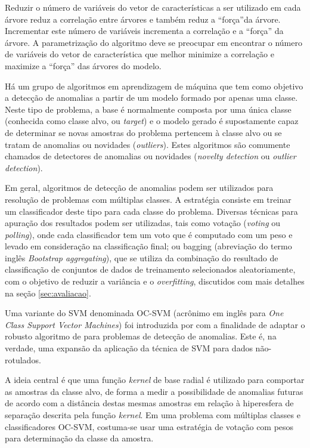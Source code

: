 Reduzir o número de variáveis do vetor de características a ser utilizado em cada árvore reduz a correlação entre árvores e também reduz a ``força''da árvore. Incrementar este número de variáveis incrementa a correlação e a ``força'' da árvore. A parametrização do algoritmo deve se preocupar em encontrar o número de variáveis do vetor de característica que melhor minimize a correlação e maximize a ``força'' das árvores do modelo.

Há um grupo de algoritmos em aprendizagem de máquina que tem como objetivo a detecção de anomalias a partir de um modelo formado por apenas uma classe. Neste tipo de problema, a base é normalmente composta por uma única classe (conhecida como classe alvo, ou \textit{target}) e o modelo gerado é supostamente capaz de determinar se novas amostras do problema pertencem à classe alvo ou se tratam de anomalias ou novidades (\textit{outliers}). Estes algoritmos são comumente chamados de detectores de anomalias ou novidades (\textit{novelty detection} ou \textit{outlier detection}).

Em geral, algoritmos de detecção de anomalias podem ser utilizados para resolução de problemas com múltiplas classes. A estratégia consiste em treinar um classificador deste tipo para cada classe do problema. Diversas técnicas para apuração dos resultados podem ser utilizadas, tais como votação (\textit{voting} ou \textit{polling}), onde cada classificador tem um voto que é computado com um peso e levado em consideração na classificação final; ou bagging (abreviação do termo inglês \textit{Bootstrap aggregating}), que se utiliza da combinação do resultado de classificação de conjuntos de dados de treinamento selecionados aleatoriamente, com o objetivo de reduzir a variância e o \textit{overfitting}, discutidos com mais detalhes na seção \ref{sec:avaliacao}.

Uma variante do SVM denominada OC-SVM (acrônimo em inglês para \textit{One Class Support Vector Machines}) foi introduzida por  com a finalidade de adaptar o robusto algoritmo de  para problemas de detecção de anomalias. Este é, na verdade, uma expansão da aplicação da técnica de SVM para dados não-rotulados.

A ideia central é que uma função \textit{kernel} de base radial é utilizado para comportar as amostras da classe alvo, de forma a medir a possibilidade de anomalias futuras de acordo com a distância destas mesmas amostras em relação à hiperesfera de separação descrita pela função \textit{kernel}. Em uma problema com múltiplas classes e classificadores OC-SVM, costuma-se usar uma estratégia de votação com pesos para determinação da classe da amostra.

